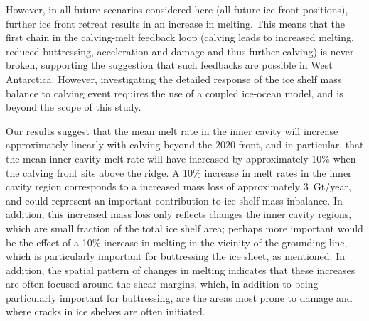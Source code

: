 \documentclass[draft]{agujournal2019}
\begin{document}
However, in all future scenarios considered here (all future ice front positions), further ice front retreat results in an increase in melting. This means that the first chain in the calving-melt feedback loop (calving leads to increased melting, reduced buttressing, acceleration and damage and thus further calving) is never broken, supporting the suggestion that such feedbacks are possible in West Antarctica. However, investigating the detailed response of the ice shelf mass balance to calving event requires the use of a coupled ice-ocean model, and is beyond the scope of this study.

Our results suggest that the mean melt rate in the inner cavity will increase approximately linearly with calving beyond the 2020 front, and in particular, that  the mean inner cavity melt rate will have increased by approximately 10\% when the calving front sits above the ridge. A 10\% increase in melt rates in the inner cavity region corresponds to a increased mass loss of approximately 3~Gt/year, and could represent an important contribution to ice shelf mass inbalance. In addition, this increased mass loss only reflects changes the inner cavity regions, which are small fraction of the total ice shelf area; perhaps more important would be the effect of a 10\% increase in melting in the vicinity of the grounding line, which is particularly important for buttressing the ice sheet, as mentioned. In addition, the spatial pattern of changes in melting indicates that these increases are often focused around the shear margins, which, in addition to being particularly important for buttressing, are the areas most prone to damage and where cracks in ice shelves are often initiated.


\end{document}
